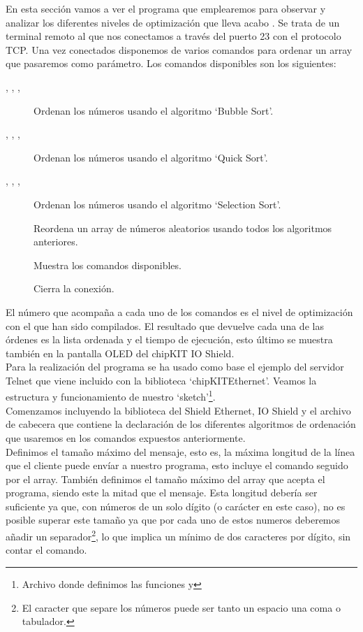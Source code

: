 En esta sección vamos a ver el programa que emplearemos para observar y analizar los diferentes niveles de optimización que lleva acabo . Se trata de un terminal remoto al que nos conectamos a través del puerto 23 con el protocolo TCP. Una vez conectados disponemos de varios comandos para ordenar un array que pasaremos como parámetro. Los comandos disponibles son los siguientes:

\begin{description}
	\item[, , , ] Ordenan los números usando el algoritmo `Bubble Sort'.
	\item[, , , ] Ordenan los números usando el algoritmo `Quick Sort'.
	\item[, , , ] Ordenan los números usando el algoritmo `Selection Sort'.
	\item[] Reordena un array de números aleatorios usando todos los algoritmos anteriores.
	\item[] Muestra los comandos disponibles.
	\item[] Cierra la conexión.
\end{description}

El número que acompaña a cada uno de los comandos es el nivel de optimización con el que han sido compilados. El resultado que devuelve cada una de las órdenes es la lista ordenada y el tiempo de ejecución, esto último se muestra también en la pantalla OLED del chipKIT IO Shield.\\
Para la realización del programa se ha usado como base el ejemplo del servidor Telnet que viene incluido con la biblioteca `chipKITEthernet'. Veamos la estructura y funcionamiento de nuestro `sketch'\protect\footnote{Archivo donde definimos las funciones  y }.\\

Comenzamos incluyendo la biblioteca del Shield Ethernet, IO Shield y el archivo de cabecera  que contiene la declaración de los diferentes algoritmos de ordenación que usaremos en los comandos expuestos anteriormente.\\


Definimos el tamaño máximo del mensaje, esto es, la máxima longitud de la línea que el cliente puede envíar a nuestro programa, esto incluye el comando seguido por el array. También definimos el tamaño máximo del array que acepta el programa, siendo este la mitad que el mensaje. Esta longitud debería ser suficiente ya que, con números de un solo dígito (o carácter en este caso), no es posible superar este tamaño ya que por cada uno de estos numeros deberemos añadir un separador\protect\footnote{El caracter que separe los números puede ser tanto un espacio una coma o tabulador.}, lo que implica un mínimo de dos caracteres por dígito, sin contar el comando.

